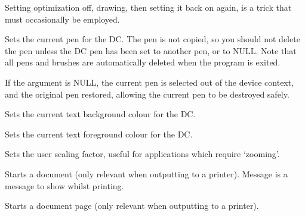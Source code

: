 Setting optimization off, drawing, then setting it back on again, is a trick
that must occasionally be employed.

\label{wxdcsetpen}


Sets the current pen for the DC.  The pen is not copied, so you should
not delete the pen unless the DC pen has been set to another pen, or
to NULL. Note that all pens and brushes are automatically deleted when
the program is exited.

If the argument is NULL, the current pen is selected out of the device
context, and the original pen restored, allowing the current pen to
be destroyed safely.

\label{wxdcsettextbackground}


Sets the current text background colour for the DC.

\label{wxdcsettextforeground}


Sets the current text foreground colour for the DC.

\label{wxdcsetuserscale}


Sets the user scaling factor, useful for applications which require
`zooming'.



Starts a document (only relevant when outputting to a printer).
Message is a message to show whilst printing.



Starts a document page (only relevant when outputting to a printer).



\section{}\label{wxdebugcontext}


